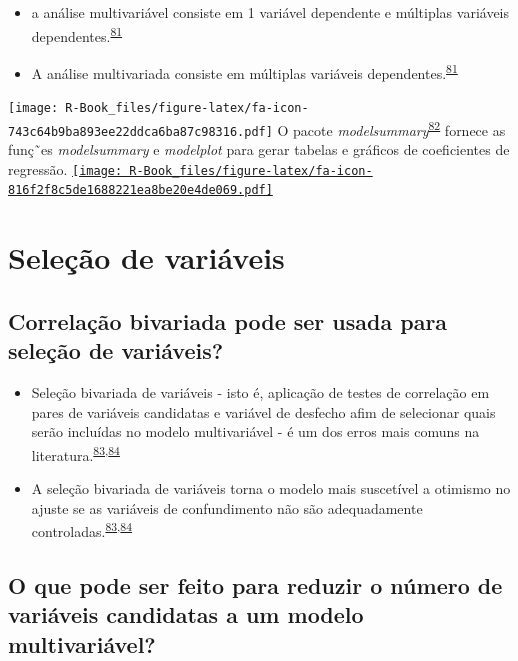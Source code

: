 \documentclass[
]{book}
\begin{document}
\begin{itemize}
\item
  a análise multivariável consiste em 1 variável dependente e múltiplas variáveis dependentes.\textsuperscript{\protect\hyperlink{ref-Hidalgo2013}{81}}
\item
  A análise multivariada consiste em múltiplas variáveis dependentes.\textsuperscript{\protect\hyperlink{ref-Hidalgo2013}{81}}
\end{itemize}

\texttt{[image: R-Book\_files/figure-latex/fa-icon-743c64b9ba893ee22ddca6ba87c98316.pdf]} O pacote \emph{modelsummary}\textsuperscript{\protect\hyperlink{ref-modelsummary}{82}} fornece as funç˜es \emph{modelsummary} e \emph{modelplot} para gerar tabelas e gráficos de coeficientes de regressão. \href{https://cloud.r-project.org/web/packages/modelsummary/index.html}{\texttt{[image: R-Book\_files/figure-latex/fa-icon-816f2f8c5de1688221ea8be20e4de069.pdf]}}

\hypertarget{selecao}{%
\section{Seleção de variáveis}\label{selecao}}

\hypertarget{correlauxe7uxe3o-bivariada-pode-ser-usada-para-seleuxe7uxe3o-de-variuxe1veis}{%
\subsection{Correlação bivariada pode ser usada para seleção de variáveis?}\label{correlauxe7uxe3o-bivariada-pode-ser-usada-para-seleuxe7uxe3o-de-variuxe1veis}}

\begin{itemize}
\item
  Seleção bivariada de variáveis - isto é, aplicação de testes de correlação em pares de variáveis candidatas e variável de desfecho afim de selecionar quais serão incluídas no modelo multivariável - é um dos erros mais comuns na literatura.\textsuperscript{\protect\hyperlink{ref-Dales1978}{83},\protect\hyperlink{ref-Sun1996}{84}}
\item
  A seleção bivariada de variáveis torna o modelo mais suscetível a otimismo no ajuste se as variáveis de confundimento não são adequadamente controladas.\textsuperscript{\protect\hyperlink{ref-Dales1978}{83},\protect\hyperlink{ref-Sun1996}{84}}
\end{itemize}

\hypertarget{o-que-pode-ser-feito-para-reduzir-o-nuxfamero-de-variuxe1veis-candidatas-a-um-modelo-multivariuxe1vel}{%
\subsection{O que pode ser feito para reduzir o número de variáveis candidatas a um modelo multivariável?}\label{o-que-pode-ser-feito-para-reduzir-o-nuxfamero-de-variuxe1veis-candidatas-a-um-modelo-multivariuxe1vel}}
\end{document}
